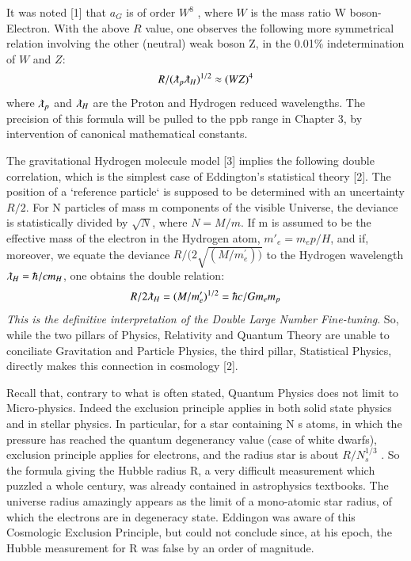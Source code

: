 \documentclass[twoside,draft]{article}
\begin{document}
\begin{sloppypar}
{It was noted [1] that $a_{G}$ is of order $W^{8}$ , where $W$ is the mass ratio W boson-
Electron. With the above $R$ value, one observes the following more symmetrical relation involving
the other (neutral) weak boson Z, in the 0.01\% indetermination of $W$ and $Z$:
\begin{equation}
R/(\lambdabar_{p}\lambdabar_{H})^{1/2}\approx (WZ)^4
\end{equation}
where $\lambdabar_{p}$ and $\lambdabar_{H}$ are the Proton and Hydrogen reduced wavelengths. The precision of this formula
will be pulled to the ppb range in Chapter 3, by intervention of canonical mathematical constants.

The gravitational Hydrogen molecule model [3] implies the following double correlation,
which is the simplest case of Eddington's statistical theory [2]. The position of a `reference particle`
is supposed to be determined with an uncertainty ${R/2}$. For N particles of mass m components of the visible Universe, the deviance is statistically divided by $\sqrt{N}$, where $N = M/m$. If m is assumed to be
the effective mass of the electron in the Hydrogen atom, $m\prime_{e} = m_{e} p/H$, and if, moreover, we equate
the deviance $R/(2\sqrt{(M/m^{\prime}_{e}))}$ to the Hydrogen wavelength $\lambdabar_{H} = \hbar/c m_{H}$, one obtains the double relation:
\begin{equation}
R/2\lambdabar_{H} = (M/m^{\prime}_{e})^{1/2} = \hbar c/G m_{e} m_{p}
\end{equation}
\textit{This is the definitive interpretation of the Double Large Number Fine-tuning}. So, while the two
pillars of Physics, Relativity and Quantum Theory are unable to conciliate Gravitation and Particle
Physics, the third pillar, Statistical Physics, directly makes this connection in cosmology [2].

Recall that, contrary to what is often stated, Quantum Physics does not limit to Micro-physics.
Indeed the exclusion principle applies in both solid state physics and in stellar physics. In particular,
for a star containing N s atoms, in which the pressure has reached the quantum degenerancy value
(case of white dwarfs), exclusion principle applies for electrons, and the radius star is about $R/N_{s}^{1/3}$ .
So the formula giving the Hubble radius R, a very difficult measurement which puzzled a whole
century, was already contained in astrophysics textbooks. The universe radius amazingly appears as
the limit of a mono-atomic star radius, of which the electrons are in degeneracy state. Eddingon was
aware of this Cosmologic Exclusion Principle, but could not conclude since, at his epoch, the
Hubble measurement for R was false by an order of magnitude.

}
\end{sloppypar}
\end{document}
